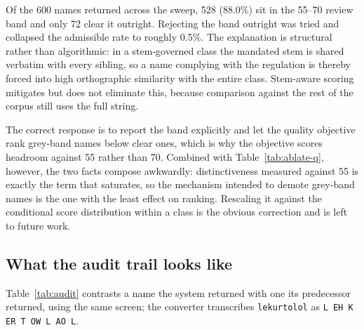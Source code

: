 \documentclass[conference]{IEEEtran}
\newcommand{\code}[1]{\texttt{\footnotesize #1}}
\begin{document}
Of the 600 names returned across the sweep, 528 (88.0\%) sit in the 55--70
review band and only 72 clear it outright. Rejecting the band outright was tried
and collapsed the admissible rate to roughly 0.5\%. The explanation is
structural rather than algorithmic: in a stem-governed class the mandated stem
is shared verbatim with every sibling, so a name complying with the regulation
is thereby forced into high orthographic similarity with the entire class.
Stem-aware scoring mitigates but does not eliminate this, because comparison
against the rest of the corpus still uses the full string.

The correct response is to report the band explicitly and let the quality
objective rank grey-band names below clear ones, which is why the objective
scores headroom against 55 rather than 70. Combined with
Table~\ref{tab:ablate-q}, however, the two facts compose awkwardly:
distinctiveness measured against 55 is exactly the term that saturates, so the
mechanism intended to demote grey-band names is the one with the least effect on
ranking. Rescaling it against the conditional score distribution within a class
is the obvious correction and is left to future work.

\subsection{What the audit trail looks like}

Table~\ref{tab:audit} contrasts a name the system returned with one its
predecessor returned, using the same screen; the converter transcribes
\code{lekurtolol} as \code{L EH K ER T OW L AO L}.
\end{document}
